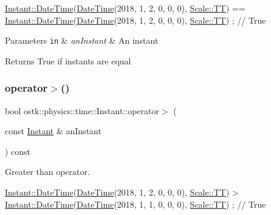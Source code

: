 \begin{DoxyCode}
\hyperlink{classostk_1_1physics_1_1time_1_1_instant_afd5725574a02389b80fad4baff313c8a}{Instant::DateTime}(\hyperlink{classostk_1_1physics_1_1time_1_1_instant_afd5725574a02389b80fad4baff313c8a}{DateTime}(2018, 1, 2, 0, 0, 0), 
      \hyperlink{namespaceostk_1_1physics_1_1time_adf23d37bd8641fb76a0e98ab46a70df7adf1f3edb9115acb0a1e04209b7a9937b}{Scale::TT}) == \hyperlink{classostk_1_1physics_1_1time_1_1_instant_afd5725574a02389b80fad4baff313c8a}{Instant::DateTime}(\hyperlink{classostk_1_1physics_1_1time_1_1_instant_afd5725574a02389b80fad4baff313c8a}{DateTime}(2018, 1, 2, 0, 0, 0), 
      \hyperlink{namespaceostk_1_1physics_1_1time_adf23d37bd8641fb76a0e98ab46a70df7adf1f3edb9115acb0a1e04209b7a9937b}{Scale::TT}) ; \textcolor{comment}{// True}
\end{DoxyCode}



\begin{DoxyParams}[1]{Parameters}
\mbox{\tt in}  & {\em an\+Instant} & An instant \\
\hline
\end{DoxyParams}
\begin{DoxyReturn}{Returns}
True if instants are equal 
\end{DoxyReturn}
\mbox{\label{classostk_1_1physics_1_1time_1_1_instant_a1e73faadcf3c6724a5e67f35db007697}} 
\subsubsection{\texorpdfstring{operator$>$()}{operator>()}}
{\footnotesize\ttfamily bool ostk\+::physics\+::time\+::\+Instant\+::operator$>$ (\begin{DoxyParamCaption}\item[{const \hyperlink{classostk_1_1physics_1_1time_1_1_instant}{Instant} \&}]{an\+Instant }\end{DoxyParamCaption}) const}



Greater than operator. 


\begin{DoxyCode}
\hyperlink{classostk_1_1physics_1_1time_1_1_instant_afd5725574a02389b80fad4baff313c8a}{Instant::DateTime}(\hyperlink{classostk_1_1physics_1_1time_1_1_instant_afd5725574a02389b80fad4baff313c8a}{DateTime}(2018, 1, 2, 0, 0, 0), 
      \hyperlink{namespaceostk_1_1physics_1_1time_adf23d37bd8641fb76a0e98ab46a70df7adf1f3edb9115acb0a1e04209b7a9937b}{Scale::TT}) > \hyperlink{classostk_1_1physics_1_1time_1_1_instant_afd5725574a02389b80fad4baff313c8a}{Instant::DateTime}(\hyperlink{classostk_1_1physics_1_1time_1_1_instant_afd5725574a02389b80fad4baff313c8a}{DateTime}(2018, 1, 1, 0, 0, 0), 
      \hyperlink{namespaceostk_1_1physics_1_1time_adf23d37bd8641fb76a0e98ab46a70df7adf1f3edb9115acb0a1e04209b7a9937b}{Scale::TT}) ; \textcolor{comment}{// True}
\end{DoxyCode}




